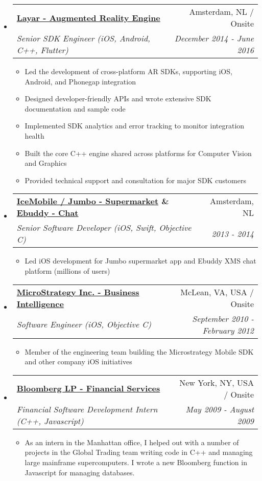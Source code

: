 \documentclass[letterpaper,11pt]{article}
\makeatletter
\newcommand{\resitem}[1]{\item #1 \vspace{-2pt}}
\newcommand{\ressubheading}[4]{
\begin{tabular*}{7.0in}{l@{\extracolsep{\fill}}r}
    \textbf{#1} & #2 \\
    \textit{#3} & \textit{#4} \\
\end{tabular*}\vspace{-6pt}}
\makeatother
\begin{document}
\begin{itemize}
\item
    \ressubheading{\href{https://www.layar.com/}{Layar - Augmented Reality Engine}}{Amsterdam, NL / Onsite}{Senior SDK Engineer (iOS, Android, C++, Flutter)}{December 2014 - June 2016}
    \begin{itemize}
        \resitem{Led the development of cross-platform AR SDKs, supporting iOS, Android, and Phonegap integration}
        \resitem{Designed developer-friendly APIs and wrote extensive SDK documentation and sample code}
        \resitem{Implemented SDK analytics and error tracking to monitor integration health}
        \resitem{Built the core C++ engine shared across platforms for Computer Vision and Graphics}
        \resitem{Provided technical support and consultation for major SDK customers}
    \end{itemize}

\item
    \ressubheading{\href{https://www.icemobile.com}{IceMobile / Jumbo - Supermarket} \& \href{http://www.ebuddy.com}{Ebuddy - Chat}}{Amsterdam, NL}{Senior Software Developer (iOS, Swift, Objective C)}{2013 - 2014}
    \begin{itemize}
        \resitem{Led iOS development for Jumbo supermarket app and Ebuddy XMS chat platform (millions of users)}
    \end{itemize}

\item
    \ressubheading{\href{http://www.microstrategy.com/Company}{MicroStrategy Inc. - Business Intelligence}}{McLean, VA, USA / Onsite}{Software Engineer (iOS, Objective C)}{September 2010 - February 2012}
    \begin{itemize}
        \resitem{Member of the engineering team building the Microstrategy Mobile SDK and other company iOS initiatives}
    \end{itemize}
    
\item
    \ressubheading{\href{http://www.bloomberg.com}{Bloomberg LP - Financial Services}}{New York, NY, USA / Onsite}{Financial Software Development Intern (C++, Javascript)}{May 2009 - August 2009}
    \begin{itemize}
      \resitem{As an intern in the Manhattan office, I helped out with a number of projects in the Global Trading team writing code in C++ and managing large mainframe supercomputers. I wrote a new Bloomberg function in Javascript for managing databases.}
    \end{itemize}
    
    
\end{itemize}
\end{document}
